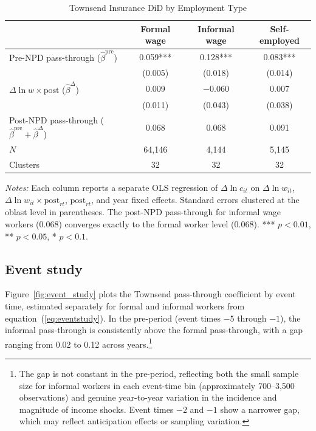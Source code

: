 \documentclass[12pt]{article}
\begin{document}
\begin{table}[htbp]
\centering
\caption{Townsend Insurance DiD by Employment Type}
\label{tab:did_bytype}
\small
\begin{tabular}{lccc}
\toprule
 & Formal wage & Informal wage & Self-employed \\
\midrule
Pre-NPD pass-through ($\hat{\beta}^{\text{pre}}$) & 0.059*** & 0.128*** & 0.083*** \\
 & (0.005) & (0.018) & (0.014) \\[4pt]
$\Delta \ln w \times \text{post}$ ($\hat{\beta}^{\Delta}$) & 0.009 & $-$0.060 & 0.007 \\
 & (0.011) & (0.043) & (0.038) \\[4pt]
Post-NPD pass-through ($\hat{\beta}^{\text{pre}} + \hat{\beta}^{\Delta}$) & 0.068 & 0.068 & 0.091 \\
\midrule
$N$ & 64,146 & 4,144 & 5,145 \\
Clusters & 32 & 32 & 32 \\
\bottomrule
\end{tabular}
\begin{minipage}{0.9\textwidth}
\vspace{0.3em}
\footnotesize \textit{Notes:} Each column reports a separate OLS regression of $\Delta \ln c_{it}$ on $\Delta \ln w_{it}$, $\Delta \ln w_{it} \times \text{post}_{rt}$, $\text{post}_{rt}$, and year fixed effects. Standard errors clustered at the oblast level in parentheses. The post-NPD pass-through for informal wage workers (0.068) converges exactly to the formal worker level (0.068). *** $p < 0.01$, ** $p < 0.05$, * $p < 0.1$.
\end{minipage}
\end{table}

\subsection{Event study}

Figure~\ref{fig:event_study} plots the Townsend pass-through coefficient by event time, estimated separately for formal and informal workers from equation~(\ref{eq:eventstudy}). In the pre-period (event times $-5$ through $-1$), the informal pass-through is consistently above the formal pass-through, with a gap ranging from 0.02 to 0.12 across years.\footnote{The gap is not constant in the pre-period, reflecting both the small sample size for informal workers in each event-time bin (approximately 700--3,500 observations) and genuine year-to-year variation in the incidence and magnitude of income shocks. Event times $-2$ and $-1$ show a narrower gap, which may reflect anticipation effects or sampling variation.}
\end{document}
